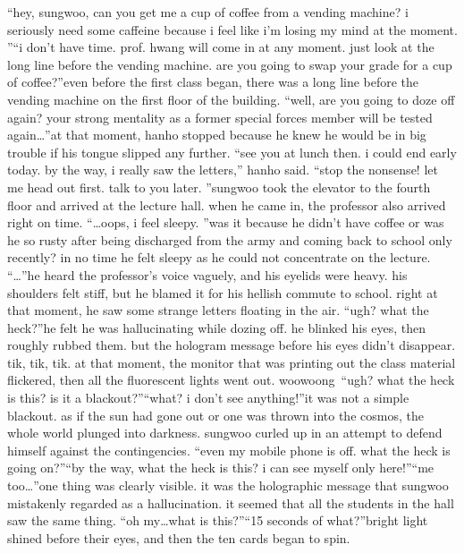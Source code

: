 “hey, sungwoo, can you get me a cup of coffee from a vending machine? i seriously need some caffeine because i feel like i’m losing my mind at the moment.
”“i don’t have time.
 prof.
 hwang will come in at any moment.
 just look at the long line before the vending machine.
 are you going to swap your grade for a cup of coffee?”even before the first class began, there was a long line before the vending machine on the first floor of the building.
“well, are you going to doze off again? your strong mentality as a former special forces member will be tested again…”at that moment, hanho stopped because he knew he would be in big trouble if his tongue slipped any further.
“see you at lunch then.
 i could end early today.
 by the way, i really saw the letters,” hanho said.
“stop the nonsense! let me head out first.
 talk to you later.
”sungwoo took the elevator to the fourth floor and arrived at the lecture hall.
 when he came in, the professor also arrived right on time.
“…oops, i feel sleepy.
”was it because he didn’t have coffee or was he so rusty after being discharged from the army and coming back to school only recently? in no time he felt sleepy as he could not concentrate on the lecture.
“…”he heard the professor’s voice vaguely, and his eyelids were heavy.
 his shoulders felt stiff, but he blamed it for his hellish commute to school.
right at that moment, he saw some strange letters floating in the air.
“ugh? what the heck?”he felt he was hallucinating while dozing off.
 he blinked his eyes, then roughly rubbed them.
 but the hologram message before his eyes didn’t disappear.
tik, tik, tik.
at that moment, the monitor that was printing out the class material flickered, then all the fluorescent lights went out.
woowoong~“ugh? what the heck is this? is it a blackout?”“what? i don’t see anything!”it was not a simple blackout.
 as if the sun had gone out or one was thrown into the cosmos, the whole world plunged into darkness.
sungwoo curled up in an attempt to defend himself against the contingencies.
“even my mobile phone is off.
 what the heck is going on?”“by the way, what the heck is this? i can see myself only here!”“me too…”one thing was clearly visible.
 it was the holographic message that sungwoo mistakenly regarded as a hallucination.
 it seemed that all the students in the hall saw the same thing.
“oh my…what is this?”“15 seconds of what?”bright light shined before their eyes, and then the ten cards began to spin.


